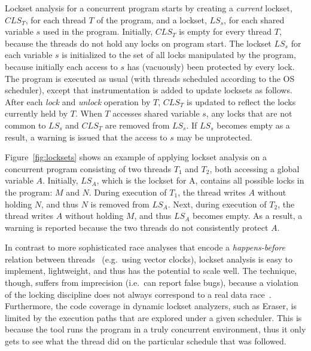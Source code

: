 Lockset analysis for a concurrent program starts by creating a \emph{current} lockset, $\mathit{CLS}_T$, for each thread $T$ of the program, and a lockset, $\mathit{LS}_s$, for each shared variable $s$ used in the program. Initially, $\mathit{CLS}_T$ is empty for every thread $T$, because the threads do not hold any locks on program start. The lockset $\mathit{LS}_s$ for each variable $s$ is initialized to the set of all locks manipulated by the program, because initially each access to $s$ has (vacuously) been protected by every lock. The program is executed as usual (with threads scheduled according to the OS scheduler), except that instrumentation is added to update locksets as follows.
%
After each \emph{lock} and \emph{unlock} operation by $T$, $\mathit{CLS}_T$ is updated to reflect the locks currently held by $T$.
%
When $T$ accesses shared variable $s$, any locks that are not common to $\mathit{LS}_s$ and $\mathit{CLS}_T$ are removed from $\mathit{LS}_s$.
If $\mathit{LS}_s$ becomes empty as a result, a warning is issued that the access to $s$ may be unprotected.

Figure~\ref{fig:locksets} shows an example of applying lockset analysis on a concurrent program consisting of two threads $T_1$ and $T_2$, both accessing a global variable $A$. Initially, $\mathit{LS}_A$, which is the lockset for A, contains all possible locks in the program: $M$ and $N$. During execution of $T_1$, the thread writes $A$ without holding $N$, and thus $N$ is removed from $\mathit{LS}_A$. Next, during execution of $T_2$, the thread writes $A$ without holding $M$, and thus $\mathit{LS}_A$ becomes empty. As a result, a warning is reported because the two threads do not consistently protect $A$.

In contrast to more sophisticated race analyses that encode a \emph{happens-before} relation between threads~\cite{lamport1978time} (e.g.\ using vector clocks), lockset analysis is easy to implement, lightweight, and thus has the potential to scale well.  The technique, though, suffers from imprecision (i.e.\ can report false bugs), because a violation of the locking discipline does not always correspond to a real data race~\cite{savage1997eraser, pozniansky2003efficient, o2003hybrid, elmas2007goldilocks, flanagan2009fasttrack}. Furthermore, the code coverage in dynamic lockset analyzers, such as Eraser, is limited by the execution paths that are explored under a given scheduler. This is because the tool runs the program in a truly concurrent environment, thus it only gets to see what the thread did on the particular schedule that was followed.

